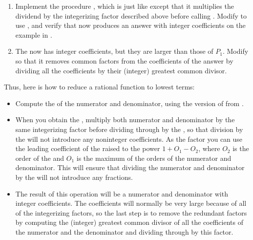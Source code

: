 \begin{exercise}
	\label{Exercise 2.96}
	\begin{enumerate}[label = \alph*., leftmargin = *]

		\item
			Implement the procedure , which is just like  except that it multiplies the dividend by the integerizing factor described above before calling .
			Modify  to use , and verify that  now produces an answer with integer coefficients on the example in .

		\item
			The  now has integer coefficients, but they are larger than those of \( P_1 \).
			Modify  so that it removes common factors from the coefficients of the answer by dividing all the coefficients by their (integer) greatest common divisor.

	\end{enumerate}
\end{exercise}



Thus, here is how to reduce a rational function to lowest terms:
\begin{itemize}

	\item
		Compute the  of the numerator and denominator, using the version of  from .

	\item
		When you obtain the , multiply both numerator and denominator by the same integerizing factor before dividing through by the , so that division by the  will not introduce any noninteger coefficients.
		As the factor you can use the leading coefficient of the  raised to the power \( 1 + O_1 - O_2 \), where \( O_2 \) is the order of the  and \( O_1 \) is the maximum of the orders of the numerator and denominator.
		This will ensure that dividing the numerator and denominator by the  will not introduce any fractions.

	\item
		The result of this operation will be a numerator and denominator with integer coefficients.
		The coefficients will normally be very large because of all of the integerizing factors, so the last step is to remove the redundant factors by computing the (integer) greatest common divisor of all the coefficients of the numerator and the denominator and dividing through by this factor.

\end{itemize}



